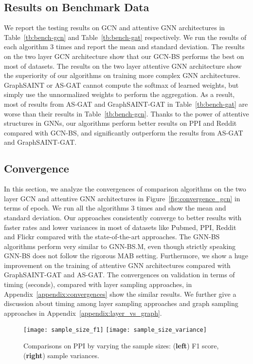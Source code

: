 \documentclass{article}
\begin{document}
\subsection{Results on Benchmark Data}\label{sec:benchmark}
We report the testing results on GCN and attentive
GNN architectures in Table~\ref{tb:bench-gcn} and 
Table~\ref{tb:bench-gat} respectively.
We run the results of each algorithm $3$ times and
report the mean and standard deviation.
The results on the two layer GCN architecture show that our
GCN-BS performs the best on most of datasets. 
The results on the two layer attentive GNN architecture show
the superiority of our algorithms on training more complex
GNN architectures. GraphSAINT or AS-GAT cannot compute 
the softmax of learned weights, but
simply use the unnormalized weights to perform the aggregation.
As a result, most of results from AS-GAT and GraphSAINT-GAT
in Table~\ref{tb:bench-gat} are worse than their results
in Table~\ref{tb:bench-gcn}. Thanks to the power of 
attentive structures in GNNs, our algorithms perform
better results on PPI and Reddit compared with
GCN-BS, and significantly outperform the results from 
AS-GAT and GraphSAINT-GAT.






\subsection{Convergence}
In this section, we analyze the convergences of 
comparison algorithms on the two layer GCN and 
attentive GNN architectures in Figure~\ref{fig:convergence_gcn} 
in terms of epoch.
We run all the algorithms $3$ times and show the mean and standard 
deviation.
Our approaches consistently converge to better results 
with faster rates and lower variances in most of
datasets like Pubmed, PPI, Reddit and Flickr compared with
the state-of-the-art approaches.
The GNN-BS algorithms perform very similar to GNN-BS.M, even though
strictly speaking GNN-BS does not follow the rigorous MAB setting.
Furthermore, we show a huge improvement on the training
of attentive GNN architectures compared with GraphSAINT-GAT
and AS-GAT.
The convergences on validation in terms of 
timing (seconds), compared with layer sampling
approaches, in Appendix~\ref{appendix:convergences} 
show the similar results. 
We further give a discussion about timing
among layer sampling approaches and graph sampling approaches
in Appendix~\ref{appendix:layer_vs_graph}.


\begin{figure}[h]
\texttt{[image: sample\_size\_f1]}
\texttt{[image: sample\_size\_variance]}
\caption{Comparisons on PPI by varying the sample sizes: 
(\textbf{left}) F1 score, (\textbf{right}) sample variances.}
\label{fig:sample_size}
\end{figure}
\end{document}

